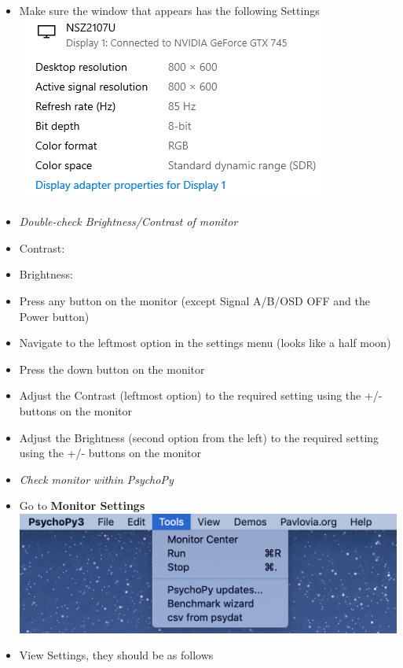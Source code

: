 \documentclass[]{article}
\begin{document}
\begin{itemize}
\item
  Make sure the window that appears has the following Settings\\
  \includegraphics{images/ds5.PNG}\\
\item
  \emph{Double-check Brightness/Contrast of monitor}
\item
  Contrast:
\item
  Brightness:
\item
  Press any button on the monitor (except Signal A/B/OSD OFF and the
  Power button)
\item
  Navigate to the leftmost option in the settings menu (looks like a
  half moon)
\item
  Press the down button on the monitor
\item
  Adjust the Contrast (leftmost option) to the required setting using
  the +/- buttons on the monitor
\item
  Adjust the Brightness (second option from the left) to the required
  setting using the +/- buttons on the monitor
\item
  \emph{Check monitor within PsychoPy}\\
\item
  Go to \textbf{Monitor Settings}\\
  \includegraphics{images/pp2.png}\\
\item
  View Settings, they should be as follows\\

\end{itemize}
\end{document}
